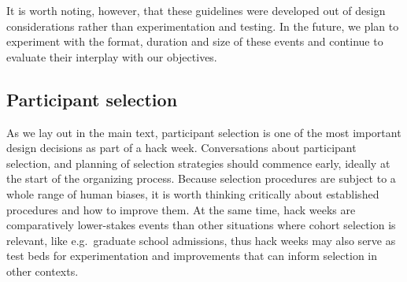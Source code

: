 \documentclass{aastex62}
\begin{document}
It is worth noting, however, that these guidelines were developed out of design considerations rather than experimentation and testing. In the future, we plan to experiment with the format, duration and size of these events and continue to evaluate their interplay with our objectives.

\subsection{Participant selection}

As we lay out in the main text, participant selection is one of the most important design decisions as part of a hack week. Conversations about participant selection, and planning of selection strategies should commence early, ideally at the start of the organizing process.
Because selection procedures are subject to a whole range of human biases, it is worth thinking critically about established procedures and how to improve them. At the same time, hack weeks are comparatively lower-stakes events than other situations where cohort selection is relevant, like e.g.\ graduate school admissions, thus hack weeks may also serve as test beds for experimentation and improvements that can inform selection in other contexts.
\end{document}
